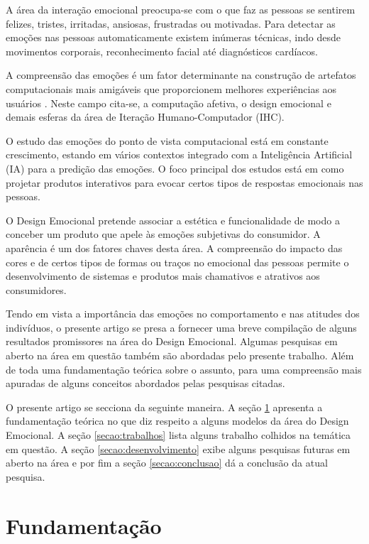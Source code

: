 \documentclass[12pt]{article}
\begin{document}
A área da interação emocional preocupa-se com o que faz as pessoas se sentirem felizes, tristes, irritadas, ansiosas, frustradas ou motivadas. Para detectar as emoções nas pessoas automaticamente existem inúmeras técnicas, indo desde movimentos corporais, reconhecimento facial até diagnósticos cardíacos. 

A compreensão das emoções é um fator determinante na construção de artefatos computacionais mais amigáveis que proporcionem melhores experiências aos usuários \cite{preece2015interaction}. Neste campo cita-se, a computação afetiva, o design emocional e demais esferas da área de Iteração Humano-Computador (IHC).

O estudo das emoções do ponto de vista computacional está em constante crescimento, estando em vários contextos integrado com a Inteligência Artificial (IA) para a predição das emoções. O foco principal dos estudos está em como projetar produtos interativos para evocar certos tipos de respostas emocionais nas pessoas.  

O Design Emocional pretende associar a estética e funcionalidade de modo a conceber um produto que apele às emoções subjetivas do consumidor. A aparência é um dos fatores chaves desta área. A compreensão do impacto das cores e de certos tipos de formas ou traços no emocional das pessoas permite o desenvolvimento de sistemas e produtos mais chamativos e atrativos aos consumidores.

Tendo em vista a importância das emoções no comportamento e nas atitudes dos indivíduos, o presente artigo se presa a fornecer uma breve compilação de alguns resultados promissores na área do Design Emocional. Algumas pesquisas em aberto na área em questão também são abordadas pelo presente trabalho. Além de toda uma fundamentação teórica sobre o assunto, para uma compreensão mais apuradas de alguns conceitos abordados pelas pesquisas citadas. 

O presente artigo se secciona da seguinte maneira. A seção \ref{secao:fundamentacao} apresenta a fundamentação teórica no que diz respeito a alguns modelos da área do Design Emocional. A seção \ref{secao:trabalhos} lista alguns trabalho colhidos na temática em questão. A seção \ref{secao:desenvolvimento} exibe alguns pesquisas futuras em aberto na área e por fim a seção \ref{secao:conclusao} dá a conclusão da atual pesquisa. 


\section{Fundamentação}\label{secao:fundamentacao}
\end{document}
